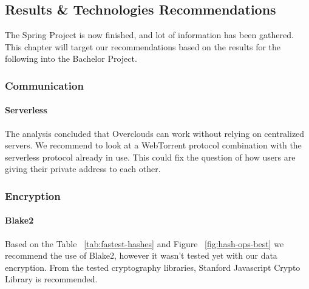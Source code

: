 
\subsection{Results \& Technologies Recommendations}
The Spring Project is now finished, and lot of information has been gathered. This chapter will target our recommendations based on the results for the following into the Bachelor Project.

\subsubsection{Communication}
\paragraph{Serverless} The analysis concluded that Overclouds can work without relying on centralized servers. We recommend to look at a WebTorrent\cite{Torrent2015WebTorrent} protocol combination with the serverless protocol already in use. This could fix the question of how users are giving their private address to each other.

\subsubsection{Encryption}
\paragraph{Blake2} Based on the Table ~\ref{tab:fastest-hashes}  and Figure ~\ref{fig:hash-ops-best} we recommend the use of Blake2, however it wasn't tested yet with our data encryption. From the tested cryptography libraries, Stanford Javascript Crypto Library is recommended.

